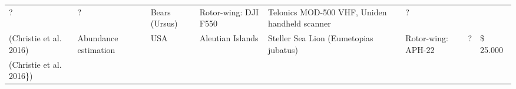 \documentclass[]{interact}
\theoremstyle{plain}%
\theoremstyle{definition}
\theoremstyle{remark}
\begin{document}
\begin{longtable}[]{@{}llllllll@{}}
\begin{minipage}[t]{0.03\columnwidth}
?\strut
\end{minipage} & \begin{minipage}[t]{0.14\columnwidth}\raggedright\strut
?\strut
\end{minipage} & \begin{minipage}[t]{0.10\columnwidth}\raggedright\strut
Bears (Ursus)\strut
\end{minipage} & \begin{minipage}[t]{0.09\columnwidth}\raggedright\strut
Rotor-wing: DJI F550\strut
\end{minipage} & \begin{minipage}[t]{0.11\columnwidth}\raggedright\strut
Telonics MOD-500 VHF, Uniden handheld scanner\strut
\end{minipage} & \begin{minipage}[t]{0.01\columnwidth}\raggedright\strut
?\strut
\end{minipage}\tabularnewline
\begin{minipage}[t]{0.11\columnwidth}\raggedright\strut
(Christie et al. 2016)\strut
\end{minipage} & \begin{minipage}[t]{0.18\columnwidth}\raggedright\strut
Abundance estimation\strut
\end{minipage} & \begin{minipage}[t]{0.03\columnwidth}\raggedright\strut
USA\strut
\end{minipage} & \begin{minipage}[t]{0.14\columnwidth}\raggedright\strut
Aleutian Islands\strut
\end{minipage} & \begin{minipage}[t]{0.10\columnwidth}\raggedright\strut
Steller Sea Lion (Eumetopias jubatus)\strut
\end{minipage} & \begin{minipage}[t]{0.09\columnwidth}\raggedright\strut
Rotor-wing: APH-22\strut
\end{minipage} & \begin{minipage}[t]{0.11\columnwidth}\raggedright\strut
?\strut
\end{minipage} & \begin{minipage}[t]{0.01\columnwidth}\raggedright\strut
\$ 25.000\strut
\end{minipage}\tabularnewline
\begin{minipage}[t]{0.11\columnwidth}\raggedright\strut
(Christie et al. 2016\})\strut
\end{minipage} & \begin{minipage}[t]{0.18\columnwidth}\raggedright\strut

\end{minipage}
\end{longtable}
\end{document}
